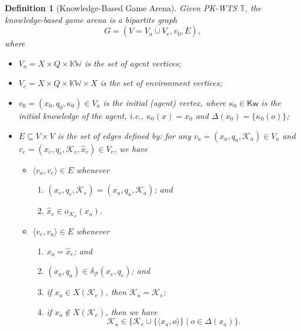 \documentclass{ifacconf}
\newtheorem{definition}{Definition}
\def \K{\mathcal{K}}
\def \<{\langle}
\def \>{\rangle}
\def \P{\mathcal{P}}
\def \kw{\textsf{Kw}}
\def \T{\mathbb{T}}
\begin{document}
\begin{definition}[Knowledge-Based Game Arena]
Given PK-WTS $\T$, the knowledge-based game arena is a bipartite graph
\[
G=(V=V_a \dot{\cup} V_e,v_0,E),
\]
where
\begin{itemize}
\item 
$V_a\!=\!X\times Q\times \mathbb{KW}$ is the set of \emph{agent vertices}; 
\item 
$V_e\!=\! X\times Q\times \mathbb{KW} \times X$ is the set of \emph{environment vertices}; 
\item 
$v_0= (x_0,q_0,  \kappa_0 ) \in V_a$ is the initial (agent) vertex, where  $\kappa_0\in \kw$ is the initial knowledge of the agent, i.e., 
$\kappa_0(x)=x_0$ and   $\Delta(x_0)=\{ \kappa_0(o)\}$; 
\item 
$E\subseteq V\times V$ is the set of edges defined by:  
for any $v_a=(x_a,q_a,\K_a)\in V_a$ and $v_e=(x_e,q_e,\K_e,\hat{x}_e)\in V_e$, we have
\begin{itemize}
    \item 
    $\< v_a,v_e\>\in E$ whenever
    \begin{enumerate}
        \item[(i)]
        $(x_e,q_e,\K_e)=(x_a,q_a,\K_a)$; and 
        \item[(ii)] 
        $\hat{x}_e\in o_{\K_a}(x_a)$. 
    \end{enumerate} 
    \item 
    $\< v_e,v_a\>\in E$ whenever
    \begin{enumerate}
        \item[(i)]
        $x_a=\hat{x}_e$; and 
        \item[(ii)] 
        $(x_a,q_a)\in \delta_\P(x_e,q_e) $; and 
        \item[(iii-1)] 
        if $x_a \in X(\K_e) $, then $\K_a=\K_e$; 
        \item[(iii-2)] 
        if $x_a \notin X(\K_e) $, then  we have  
        \[
            \K_a  \in
      \{  \K_e\cup \{\<x_a ,o\>\}  \mid  o\in \Delta( x_a )\}. 
        \]
    \end{enumerate}  
\end{itemize} 
\end{itemize}{\vspace{3pt}}
\end{definition}
\end{document}
